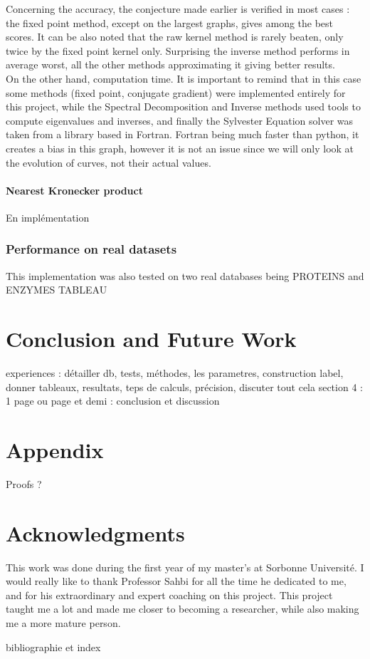 \documentclass{article}
\theoremstyle{definition}
\begin{document}
Concerning the accuracy, the conjecture made earlier is verified in most cases : the fixed point method, except on the largest graphs, gives among the best scores. It can be also noted that the raw kernel method is rarely beaten, only twice by the fixed point kernel only. Surprising the inverse method performs in average worst, all the other methods approximating it giving better results.\\
On the other hand, computation time. It is important to remind that in this case some methods (fixed point, conjugate gradient) were implemented entirely for this project, while the Spectral Decomposition and Inverse methods used tools to compute eigenvalues and inverses, and finally the Sylvester Equation solver was taken from a library based in Fortran. Fortran being much faster than python, it creates a bias in this graph, however it is not an issue since we will only look at the evolution of curves, not their actual values.
\paragraph{Nearest Kronecker product}
En implémentation

\subsubsection{Performance on real datasets}
This implementation was also tested on two real databases being PROTEINS and ENZYMES
TABLEAU

\section{Conclusion and Future Work}
experiences : détailler db, tests, méthodes, les parametres, construction label, donner tableaux, resultats, teps de calculs, précision, discuter tout cela
section 4 : 1 page ou page et demi : conclusion et discussion

\newpage
\appendix
\section{Appendix}
Proofs ?

\section*{Acknowledgments}
This work was done during the first year of my master's at Sorbonne Université. I would really like to thank Professor Sahbi for all the time he dedicated to me, and for his extraordinary and expert coaching on this project. This project taught me a lot and made me closer to becoming a researcher, while also making me a more mature person.
\listoffigures
\listoftables
bibliographie et index



\end{document}
